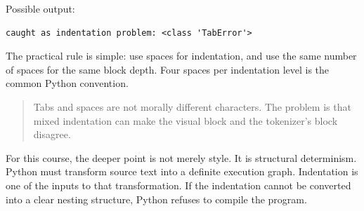 Possible output:

\begin{verbatim}
caught as indentation problem: <class 'TabError'>
\end{verbatim}

The practical rule is simple: use spaces for indentation, and use the same number of spaces for the same block depth. Four spaces per indentation level is the common Python convention.

\begin{quote}
Tabs and spaces are not morally different characters. The problem is that mixed indentation can make the visual block and the tokenizer's block disagree.
\end{quote}

For this course, the deeper point is not merely style. It is structural determinism. Python must transform source text into a definite execution graph. Indentation is one of the inputs to that transformation. If the indentation cannot be converted into a clear nesting structure, Python refuses to compile the program.